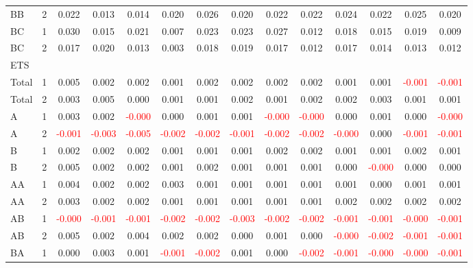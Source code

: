\begin{table}[!htb]
{\begin{tabular}{llcccccccccccc}
BB & 2 & 0.022 & 0.013 & 0.014 & 0.020 & 0.026 & 0.020 & 0.022 & 0.022 & 0.024 & 0.022 & 0.025 & 0.020\\
BC & 1 & 0.030 & 0.015 & 0.021 & 0.007 & 0.023 & 0.023 & 0.027 & 0.012 & 0.018 & 0.015 & 0.019 & 0.009\\
BC & 2 & 0.017 & 0.020 & 0.013 & 0.003 & 0.018 & 0.019 & 0.017 & 0.012 & 0.017 & 0.014 & 0.013 & 0.012\\
\hline
ETS &  &  &  &  &  &  &  &  &  &  &  &  & \\
\hline
Total & 1 & 0.005 & 0.002 & 0.002 & 0.001 & 0.002 & 0.002 & 0.002 & 0.002 & 0.001 & 0.001 & \textcolor{red}{-0.001} & \textcolor{red}{-0.001}\\
Total & 2 & 0.003 & 0.005 & 0.000 & 0.001 & 0.001 & 0.002 & 0.001 & 0.002 & 0.002 & 0.003 & 0.001 & 0.001\\
A & 1 & 0.003 & 0.002 & \textcolor{red}{-0.000} & 0.000 & 0.001 & 0.001 & \textcolor{red}{-0.000} & \textcolor{red}{-0.000} & 0.000 & 0.001 & 0.000 & \textcolor{red}{-0.000}\\
A & 2 & \textcolor{red}{-0.001} & \textcolor{red}{-0.003} & \textcolor{red}{-0.005} & \textcolor{red}{-0.002} & \textcolor{red}{-0.002} & \textcolor{red}{-0.001} & \textcolor{red}{-0.002} & \textcolor{red}{-0.002} & \textcolor{red}{-0.000} & 0.000 & \textcolor{red}{-0.001} & \textcolor{red}{-0.001}\\
B & 1 & 0.002 & 0.002 & 0.002 & 0.001 & 0.001 & 0.001 & 0.002 & 0.002 & 0.001 & 0.001 & 0.002 & 0.001\\
B & 2 & 0.005 & 0.002 & 0.002 & 0.001 & 0.002 & 0.001 & 0.001 & 0.001 & 0.000 & \textcolor{red}{-0.000} & 0.000 & 0.000\\
AA & 1 & 0.004 & 0.002 & 0.002 & 0.003 & 0.001 & 0.001 & 0.001 & 0.001 & 0.001 & 0.000 & 0.001 & 0.001\\
AA & 2 & 0.003 & 0.002 & 0.002 & 0.001 & 0.001 & 0.001 & 0.001 & 0.001 & 0.002 & 0.002 & 0.002 & 0.002\\
AB & 1 & \textcolor{red}{-0.000} & \textcolor{red}{-0.001} & \textcolor{red}{-0.001} & \textcolor{red}{-0.002} & \textcolor{red}{-0.002} & \textcolor{red}{-0.003} & \textcolor{red}{-0.002} & \textcolor{red}{-0.002} & \textcolor{red}{-0.001} & \textcolor{red}{-0.001} & \textcolor{red}{-0.000} & \textcolor{red}{-0.001}\\
AB & 2 & 0.005 & 0.002 & 0.004 & 0.002 & 0.002 & 0.000 & 0.001 & 0.000 & \textcolor{red}{-0.000} & \textcolor{red}{-0.002} & \textcolor{red}{-0.001} & \textcolor{red}{-0.001}\\
BA & 1 & 0.000 & 0.003 & 0.001 & \textcolor{red}{-0.001} & \textcolor{red}{-0.002} & 0.001 & 0.000 & \textcolor{red}{-0.002} & \textcolor{red}{-0.001} & \textcolor{red}{-0.000} & \textcolor{red}{-0.000} & \textcolor{red}{-0.001}\\

\end{tabular}}
\end{table}
